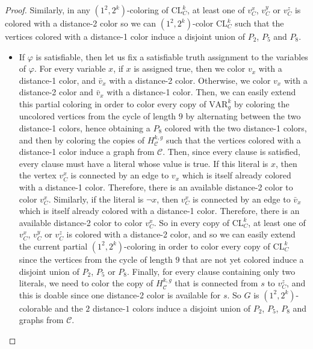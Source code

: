 \documentclass{article}
\newcommand{\colo}[2]{(1^{#1}, 2^{#2})}
\begin{document}
\begin{proof}
    Similarly, in any $\colo{2}{k}$-coloring of $\textrm{CL}^k_C$, at least one of $v_C^x$, $v_C^y$ or $v_C^z$ is colored with a distance-2 color so we can $\colo{2}{k}$-color $\textrm{CL}^k_C$ such that the vertices colored with a distance-1 color induce a disjoint union of $P_2$, $P_5$ and $P_8$. 
    \begin{itemize}
        \item If $\varphi$ is satisfiable, then let us fix a satisfiable truth assignment to the variables of $\varphi$. For every variable $x$, if $x$ is assigned true, then we color $v_x$ with a distance-1 color, and $\bar{v}_x$ with a distance-2 color. Otherwise, we color $v_x$ with a distance-2 color and $\bar{v}_x$ with a distance-1 color. Then, we can easily extend this partial coloring in order to color every copy of $\textrm{VAR}_g^k$ by coloring the uncolored vertices from the cycle of length $9$ by alternating between the two distance-1 colors, hence obtaining a $P_8$ colored with the two distance-1 colors, and then by coloring the copies of $H_\mathcal{C}^{k, g}$ such that the vertices colored with a distance-1 color induce a graph from $\mathcal{C}$. Then, since every clause is satisfied, every clause must have a literal whose value is true. If this literal is $x$, then the vertex $v_C^x$ is connected by an edge to $v_x$ which is itself already colored with a distance-1 color. Therefore, there is an available distance-2 color to color $v_C^x$. Similarly, if the literal is $\neg x$, then $v_C^x$ is connected by an edge to $\bar{v}_x$ which is itself already colored with a distance-1 color. Therefore, there is an available distance-2 color to color $v_C^x$. So in every copy of $\textrm{CL}^k_C$, at least one of $v_C^x$, $v_C^y$ or $v_C^z$ is colored with a distance-2 color, and so we can easily extend the current partial $\colo{2}{k}$-coloring in order to color every copy of $\textrm{CL}^k_C$ since the vertices from the cycle of length $9$ that are not yet colored induce a disjoint union of $P_2$, $P_5$ or $P_8$. Finally, for every clause containing only two literals, we need to color the copy of $H_\mathcal{C}^{k, g}$ that is connected from $s$ to $v_C^z$, and this is doable since one distance-2 color is available for $s$. So $G$ is $\colo{2}{k}$-colorable and the $2$ distance-$1$ colors induce a disjoint union of $P_2$, $P_5$, $P_8$ and graphs from $\mathcal{C}$.

\end{itemize}
\end{proof}
\end{document}
